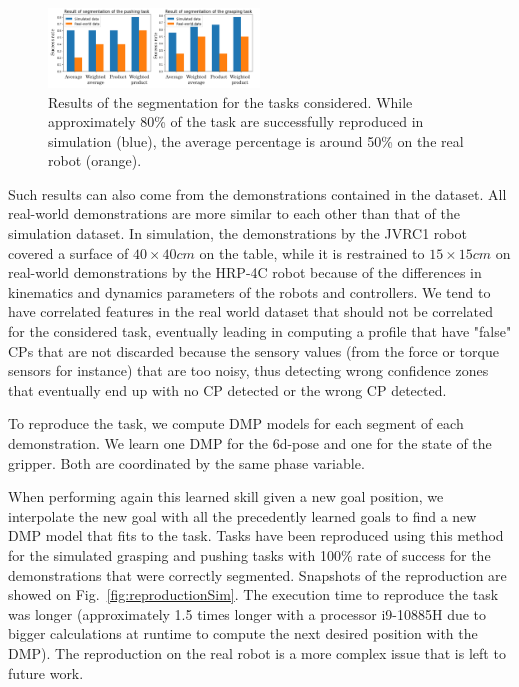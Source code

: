\documentclass[a4paper, 10pt, conference]{ieeeconf}
\begin{document}
\begin{figure}[t]
  \centering
  \includegraphics[width=0.5\textwidth]{img/results_segmentation.pdf}
  \caption{Results of the segmentation for the tasks considered. While approximately 80\% of the task are successfully reproduced in simulation (blue), the average percentage is around 50\% on the real robot (orange).}
  \label{fig:resultsSeg}
\end{figure}

Such results can also come from the demonstrations contained in the dataset. All real-world demonstrations are more similar to each other than that of the simulation dataset. In simulation, the demonstrations by the JVRC1 robot covered a surface of $40 \times 40 cm$ on the table, while it is restrained to $15 \times 15 cm$ on real-world demonstrations by the HRP-4C robot because of the differences in kinematics and dynamics parameters of the robots and controllers. We tend to have correlated features in the real world dataset that should not be correlated for the considered task, eventually leading in computing a profile that have "false" CPs that are not discarded because the sensory values (from the force or torque sensors for instance) that are too noisy, thus detecting wrong confidence zones that eventually end up with no CP detected or the wrong CP detected.

To reproduce the task, we compute DMP models for each segment of each demonstration. We learn one DMP for the 6d-pose and one for the state of the gripper. Both are coordinated by the same phase variable.

When performing again this learned skill given a new goal position, we interpolate the new goal with all the precedently learned goals to find a new DMP model that fits to the task. Tasks have been reproduced using this method for the simulated grasping and pushing tasks with 100\% rate of success for the demonstrations that were correctly segmented. Snapshots of the reproduction are showed on Fig.~\ref{fig:reproductionSim}. The execution time to reproduce the task was longer (approximately 1.5 times longer with a processor i9-10885H due to bigger calculations at runtime to compute the next desired position with the DMP). The reproduction on the real robot is a more complex issue that is left to future work. 
\end{document}
